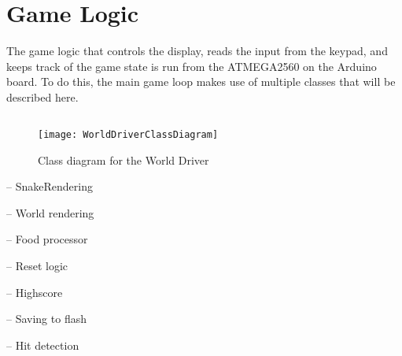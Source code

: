 \section{Game Logic}
The game logic that controls the display, reads the input from the keypad, and keeps track of the game state is run from the ATMEGA2560 on the Arduino board. To do this, the main game loop makes use of multiple classes that will be described here.

\subsection{}

\begin{figure}[H]
	\texttt{[image: WorldDriverClassDiagram]}
	\centering
	\caption{Class diagram for the World Driver}
	\label{WorldDriverClassDiagram}
\end{figure}

-- SnakeRendering

-- World rendering

-- Food processor

-- Reset logic

-- Highscore

-- Saving to flash

-- Hit detection